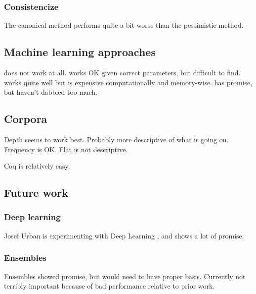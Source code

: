 \subsubsection{Consistencize}
The canonical method performs quite a bit worse than the pessimistic method.



\subsection{Machine learning approaches}

\knnadaptive does not work at all.
\nb works OK given correct parameters, but difficult to find.
\adarank works quite well but is expensive computationally and memory-wise.
\ensemble has promise, but haven't dabbled too much.

\subsection{Corpora}
Depth seems to work best. Probably more descriptive of what is going on.
Frequency is OK.
Flat is not descriptive.

Coq is relatively easy.

\subsection{Future work}
\subsubsection{Deep learning}
Josef Urban is experimenting with Deep Learning \cite{loos2017deep}, and shows a lot of promise.

\subsubsection{Ensembles}
Ensembles showed promise, but would need to have proper basis.
Currently not terribly important because of bad performance relative to prior work.

